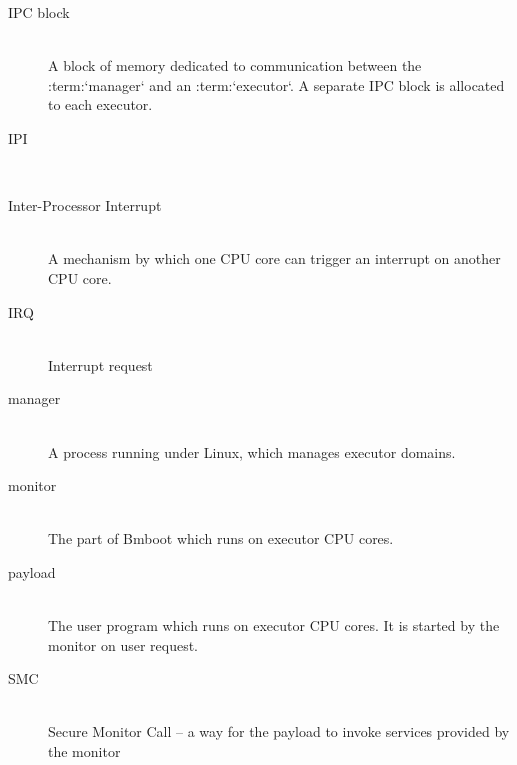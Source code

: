 \begin{description}
  \item[IPC block] \hfill \\ A block of memory dedicated to communication between the :term:`manager` and an :term:`executor`.
      A separate IPC block is allocated to each executor.

  \item[IPI] \\
  \item[Inter-Processor Interrupt] \hfill \\ A mechanism by which one CPU core can trigger an interrupt on another CPU core.

  \item[IRQ] \hfill \\ Interrupt request

  \item[manager] \hfill \\ A process running under Linux, which manages executor domains.

  \item[monitor] \hfill \\ The part of Bmboot which runs on executor CPU cores.

  \item[payload] \hfill \\ The user program which runs on executor CPU cores. It is started by the monitor on user request.

  \item[SMC] \hfill \\ Secure Monitor Call -- a way for the payload to invoke services provided by the monitor
\end{description}

